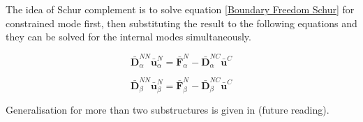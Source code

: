 \documentclass[../DomainDecomposition.tex]{subfiles}
\begin{document}
The idea of Schur complement is to solve equation \eqref{Boundary Freedom Schur} for constrained mode first, then substituting the result to the following equations and they can be solved for the internal modes simultaneously.

\begin{equation}
    \bar{\mathbf{D}}_{\alpha}^{NN} 
    \bar{\mathbf{u}}_{\alpha}^{N} 
    =
    \bar{\mathbf{F}}_{\alpha}^{N} - 
    \bar{\mathbf{D}}_{\alpha}^{NC} 
    \bar{\mathbf{u}}^{C} 
\end{equation}

\begin{equation}
    \bar{\mathbf{D}}_{\beta}^{NN} 
    \bar{\mathbf{u}}_{\beta}^{N} 
    =
    \bar{\mathbf{F}}_{\beta}^{N} - 
    \bar{\mathbf{D}}_{\beta}^{NC} 
    \bar{\mathbf{u}}^{C} 
\end{equation}

Generalisation for more than two substructures is given in \cite{chatterjee2020uncertainty} (future reading). 
\end{document}
